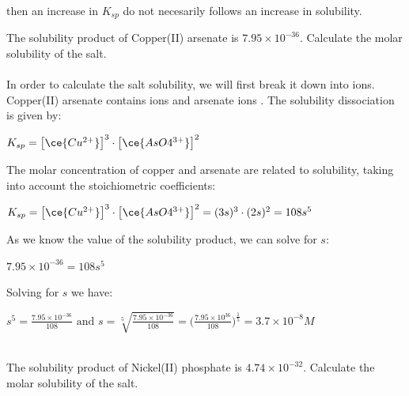 \documentclass[main.tex]{subfiles}
\begin{document}
\begin{description}
\begin{center}
\end{center}
then an increase in $K_{sp}$ do not necesarily follows an increase in solubility.
\begin{example} %
The solubility product of Copper(II) arsenate   is $7.95\times10^{-36}$. Calculate the molar solubility of the salt.\\
\\
In order to calculate the salt solubility, we will first break it down into ions. Copper(II) arsenate contains  ions and arsenate ions . The solubility dissociation is given by:
\begin{center}\hfill $K_{sp}= \big[ \ce{Cu^{2+}} \big]^3\cdot \big[ \ce{AsO4^{3+}} \big]^2$\end{center}
The molar concentration of copper and arsenate are related to solubility, taking into account the stoichiometric coefficients:
\begin{center}$K_{sp}= \big[ \ce{Cu^{2+}} \big]^3\cdot \big[ \ce{AsO4^{3+}} \big]^2=(3s)^3\cdot(2s)^2=108s^{5}$\end{center}
As we know the value of the solubility product, we can solve for $s$:
\begin{center}$7.95\times10^{-36}=108s^{5}$\end{center}
Solving for $s$ we have:
\begin{center}$s^{5}=\frac{7.95\times10^{-36}}{108}\text{ and } s=\sqrt[5]{\frac{7.95\times10^{-36}}{108}  }= \big(\frac{7.95\times10^{36}}{108} \big)^{\frac{1}{5}}=3.7\times 10^{-8}M  $\end{center}
\faDiamond\ \\
The solubility product of Nickel(II) phosphate   is $4.74\times10^{-32}$. Calculate the molar solubility of the salt.\\
\end{example}%


\end{description}
\end{document}

